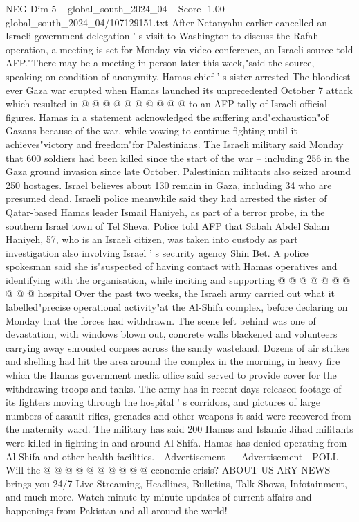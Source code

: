 \begin{textsample}{NEG Dim 5 – global\_south\_2024\_04 – Score -1.00 – global\_south\_2024\_04/107129151.txt}
After Netanyahu earlier cancelled an Israeli government delegation ' s visit to Washington to discuss the Rafah operation, a meeting is set for Monday via video conference, an Israeli source told AFP."There may be a meeting in person later this week,"said the source, speaking on condition of anonymity.
Hamas chief ' s sister arrested The bloodiest ever Gaza war erupted when Hamas launched its unprecedented October 7 attack which resulted in @ @ @ @ @ @ @ @ @ @ to an AFP tally of Israeli official figures.
Hamas in a statement acknowledged the suffering and"exhaustion"of Gazans because of the war, while vowing to continue fighting until it achieves"victory and freedom"for Palestinians.
The Israeli military said Monday that 600 soldiers had been killed since the start of the war -- including 256 in the Gaza ground invasion since late October.
Palestinian militants also seized around 250 hostages.
Israel believes about 130 remain in Gaza, including 34 who are presumed dead.
Israeli police meanwhile said they had arrested the sister of Qatar-based Hamas leader Ismail Haniyeh, as part of a terror probe, in the southern Israel town of Tel Sheva.
Police told AFP that Sabah Abdel Salam Haniyeh, 57, who is an Israeli citizen, was taken into custody as part investigation also involving Israel ' s security agency Shin Bet.
A police spokesman said she is"suspected of having contact with Hamas operatives and identifying with the organisation, while inciting and supporting @ @ @ @ @ @ @ @ @ @ hospital Over the past two weeks, the Israeli army carried out what it labelled"precise operational activity"at the Al-Shifa complex, before declaring on Monday that the forces had withdrawn.
The scene left behind was one of devastation, with windows blown out, concrete walls blackened and volunteers carrying away shrouded corpses across the sandy wasteland.
Dozens of air strikes and shelling had hit the area around the complex in the morning, in heavy fire which the Hamas government media office said served to provide cover for the withdrawing troops and tanks.
The army has in recent days released footage of its fighters moving through the hospital ' s corridors, and pictures of large numbers of assault rifles, grenades and other weapons it said were recovered from the maternity ward.
The military has said 200 Hamas and Islamic Jihad militants were killed in fighting in and around Al-Shifa.
Hamas has denied operating from Al-Shifa and other health facilities. - Advertisement - - Advertisement - POLL Will the @ @ @ @ @ @ @ @ @ @ economic crisis?
ABOUT US ARY NEWS brings you 24/7 Live Streaming, Headlines, Bulletins, Talk Shows, Infotainment, and much more.
Watch minute-by-minute updates of current affairs and happenings from Pakistan and all around the world!

\end{textsample}
